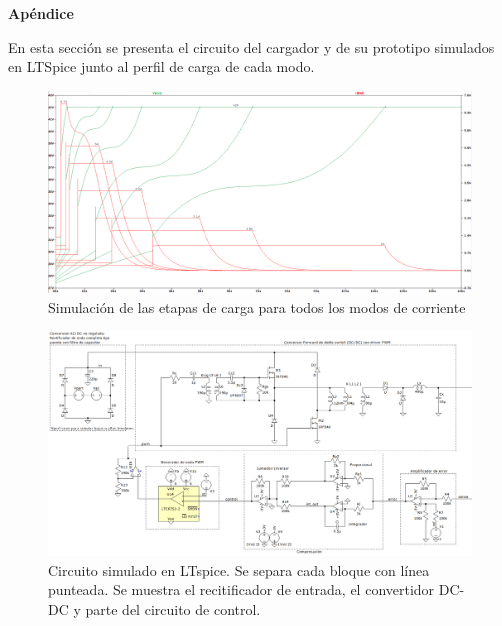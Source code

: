 \newpage
{}
\appendix

\begin{landscape}
\begin{center}
    \bfseries\LARGE Apéndice \par
\end{center}
En esta sección se presenta el circuito del cargador y de su prototipo simulados en LTSpice junto al perfil de carga de cada modo.
\begin{figure}[hbt]
    \centering
    \includegraphics[width=\linewidth]{images/carga_completa_step.png}
    \caption{Simulación de las etapas de carga para todos los modos de corriente}
    \label{fig:simulacion_carga}
\end{figure}
    
\begin{figure}[hbt]
    \centering
    \includegraphics[width=\linewidth]{images/sim-full-1.png}
    \caption{Circuito simulado en LTspice. Se separa cada bloque con línea punteada. Se muestra el recitificador de entrada, el convertidor DC-DC y parte del circuito de control.}
    \label{fig:sim-full-1}
\end{figure}


\end{landscape}
